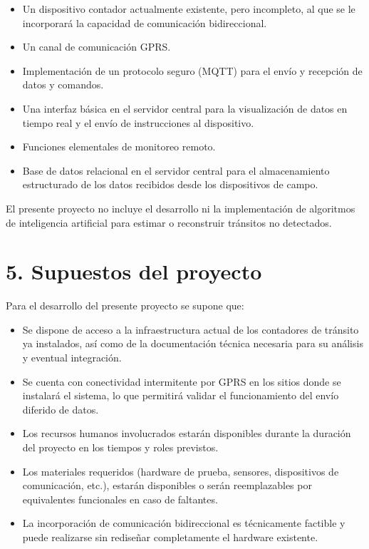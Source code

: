 \documentclass[
11pt, %
]{charter}
\begin{document}
\begin{itemize}
	\item Un dispositivo contador actualmente existente, pero incompleto, al que se le incorporará la capacidad de comunicación bidireccional.
	\item Un canal de comunicación GPRS.
	\item Implementación de un protocolo seguro (MQTT) para el envío y recepción de datos y comandos.
	\item Una interfaz básica en el servidor central para la visualización de datos en tiempo real y el envío de instrucciones al dispositivo.
	\item Funciones elementales de monitoreo remoto.
	\item Base de datos relacional en el servidor central para el almacenamiento estructurado de los datos recibidos desde los dispositivos de campo.
	
\end{itemize}

El presente proyecto no incluye el desarrollo ni la implementación de algoritmos de inteligencia artificial para estimar o reconstruir tránsitos no detectados.

\section{5. Supuestos del proyecto}
\label{sec:supuestos}

Para el desarrollo del presente proyecto se supone que:

\begin{itemize}
	\item Se dispone de acceso a la infraestructura actual de los contadores de tránsito ya instalados, así como de la documentación técnica necesaria para su análisis y eventual integración.
	\item Se cuenta con conectividad intermitente por GPRS en los sitios donde se instalará el sistema, lo que permitirá validar el funcionamiento del envío diferido de datos.
	\item Los recursos humanos involucrados  estarán disponibles durante la duración del proyecto en los tiempos y roles previstos.
	\item Los materiales requeridos (hardware de prueba, sensores, dispositivos de comunicación, etc.), estarán disponibles o serán reemplazables por equivalentes funcionales en caso de faltantes.
	\item La incorporación de comunicación bidireccional es técnicamente factible y puede realizarse sin rediseñar completamente el hardware existente.
\end{itemize}
\end{document}
